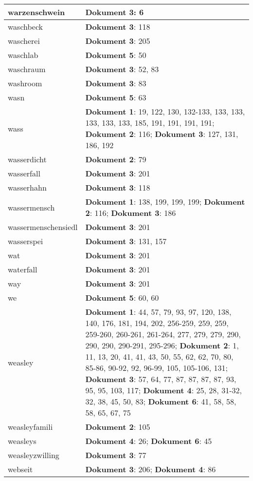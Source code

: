 \documentclass[a5paper]{article}
\begin{document}
\begin{longtable}[l]{|l|p{3in}|}
warzenschwein & \textbf{Dokument 3}: 6 \\
\hline
waschbeck & \textbf{Dokument 3}: 118 \\
\hline
wascherei & \textbf{Dokument 3}: 205 \\
\hline
waschlab & \textbf{Dokument 5}: 50 \\
\hline
waschraum & \textbf{Dokument 3}: 52, 83 \\
\hline
washroom & \textbf{Dokument 3}: 83 \\
\hline
wasn & \textbf{Dokument 5}: 63 \\
\hline
wass & \textbf{Dokument 1}: 19, 122, 130, 132-133, 133, 133, 133, 133, 133, 185, 191, 191, 191, 191; \textbf{Dokument 2}: 116; \textbf{Dokument 3}: 127, 131, 186, 192 \\
\hline
wasserdicht & \textbf{Dokument 2}: 79 \\
\hline
wasserfall & \textbf{Dokument 3}: 201 \\
\hline
wasserhahn & \textbf{Dokument 3}: 118 \\
\hline
wassermensch & \textbf{Dokument 1}: 138, 199, 199, 199; \textbf{Dokument 2}: 116; \textbf{Dokument 3}: 186 \\
\hline
wassermenschensiedl & \textbf{Dokument 3}: 201 \\
\hline
wasserspei & \textbf{Dokument 3}: 131, 157 \\
\hline
wat & \textbf{Dokument 3}: 201 \\
\hline
waterfall & \textbf{Dokument 3}: 201 \\
\hline
way & \textbf{Dokument 3}: 201 \\
\hline
we & \textbf{Dokument 5}: 60, 60 \\
\hline
weasley & \textbf{Dokument 1}: 44, 57, 79, 93, 97, 120, 138, 140, 176, 181, 194, 202, 256-259, 259, 259, 259-260, 260-261, 261-264, 277, 279, 279, 290, 290, 290, 290-291, 295-296; \textbf{Dokument 2}: 1, 11, 13, 20, 41, 41, 43, 50, 55, 62, 62, 70, 80, 85-86, 90-92, 92, 96-99, 105, 105-106, 131; \textbf{Dokument 3}: 57, 64, 77, 87, 87, 87, 87, 93, 95, 95, 103, 117; \textbf{Dokument 4}: 25, 28, 31-32, 32, 38, 45, 50, 83; \textbf{Dokument 6}: 41, 58, 58, 58, 65, 67, 75 \\
\hline
weasleyfamili & \textbf{Dokument 2}: 105 \\
\hline
weasleys & \textbf{Dokument 4}: 26; \textbf{Dokument 6}: 45 \\
\hline
weasleyzwilling & \textbf{Dokument 3}: 77 \\
\hline
webseit & \textbf{Dokument 3}: 206; \textbf{Dokument 4}: 86 \\

\end{longtable}
\end{document}
